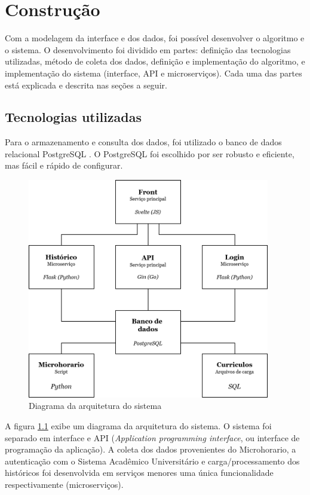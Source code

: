 \chapter{Construção}
\label{cha:Construção}

Com a modelagem da interface e dos dados, foi possível desenvolver o algoritmo e o sistema. O desenvolvimento foi dividido em partes: definição das tecnologias utilizadas, método de coleta dos dados, definição e implementação do algoritmo, e implementação do sistema (interface, API e microserviços). Cada uma das partes está explicada e descrita nas seções a seguir.

\section{Tecnologias utilizadas}
\label{sec:Tecnologias utilizadas}

Para o armazenamento e consulta dos dados, foi utilizado o banco de dados relacional PostgreSQL \cite{site-postgresql}. O PostgreSQL foi escolhido por ser robusto e eficiente, mas fácil e rápido de configurar. 

\begin{figure}[h!]
    \begin{center}
    \includegraphics[width=300pt]{figuras/diagrama-arquitetura.png}
    \caption{Diagrama da arquitetura do sistema}
    \label{fig:diagrama-arquitetura}
    \end{center}
\end{figure}

A figura \ref{fig:diagrama-arquitetura} exibe um diagrama da arquitetura do sistema. O sistema foi separado em interface e API (\textit{Application programming interface}, ou interface de programação da aplicação). A coleta dos dados provenientes do Microhorario, a autenticação com o Sistema Acadêmico Universitário e carga/processamento dos históricos foi desenvolvida em serviços menores uma única funcionalidade respectivamente (microserviços). 

